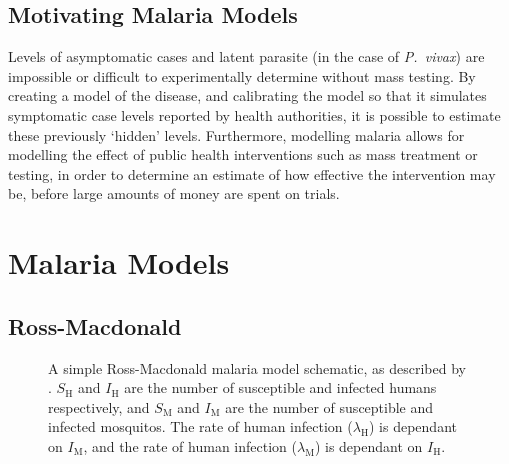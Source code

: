 \subsection*{Motivating Malaria Models}

Levels of asymptomatic cases and latent parasite (in the case of
\textit{P.\ vivax}) are impossible or difficult to experimentally determine
without mass testing. By creating a model of the disease, and calibrating the
model so that it simulates symptomatic case levels reported by health
authorities, it is possible to estimate these previously `hidden' levels.
Furthermore, modelling malaria allows for modelling the effect of public health
interventions such as mass treatment or testing, in order to determine an
estimate of how effective the intervention may be, before large amounts of
money are spent on trials.

\section{Malaria Models}

\subsection*{Ross-Macdonald}

\begin{figure}[htbp]
    \centering
    \caption{
        A simple Ross-Macdonald malaria model schematic, as described by
        \cite{aron_population_1982}. $S_\mathrm{H}$ and $I_\mathrm{H}$ are the
        number of susceptible and infected humans respectively, and
        $S_\mathrm{M}$ and $I_\mathrm{M}$ are the number of susceptible and
        infected mosquitos. The rate of human infection ($\lambda_\mathrm{H}$)
        is dependant on $I_\mathrm{M}$, and the rate of human infection
        ($\lambda_\mathrm{M}$) is dependant on $I_\mathrm{H}$.
    }
    \label{fig:ross_mac}
\end{figure}

